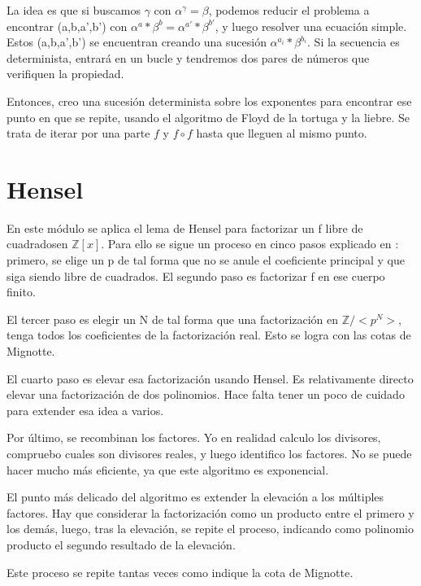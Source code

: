 \documentclass[12pt, a5paper]{article}
\theoremstyle{definition}
\begin{document}
  La idea es que si buscamos $\gamma$ con $\alpha^\gamma=\beta$,
  podemos reducir el problema a encontrar (a,b,a',b') con
  $\alpha^a*\beta^b=\alpha^{a'}*\beta^{b'}$, y luego resolver una
  ecuación simple. Estos (a,b,a',b') se encuentran creando una
  sucesión $\alpha^{a_i}*\beta^{b_i}$. Si la secuencia es
  determinista, entrará en un bucle y tendremos dos pares de números
  que verifiquen la propiedad.

  Entonces, creo una sucesión determinista sobre los exponentes para
  encontrar ese punto en que se repite, usando el algoritmo de Floyd
  de la tortuga y la liebre. Se trata de iterar por una parte $f$ y
  $f\circ f$ hasta que lleguen al mismo punto.
\newpage\newpage
  
\section{Hensel}
  En este módulo se aplica el lema de Hensel para factorizar un f
  libre de cuadradosen
  $\mathbb{Z}[x]$. Para ello se sigue
  un proceso en cinco pasos explicado en \cite{CompAlg}: primero, se
  elige un p de tal forma que no se anule el coeficiente principal y
  que siga siendo libre de cuadrados. El segundo paso es factorizar f
  en ese cuerpo finito.
 
  El tercer paso es elegir un N de tal forma que una
  factorización en $\mathbb{Z}/<p^N>$, tenga todos los coeficientes de
  la factorización real. Esto se logra con las cotas de Mignotte.

  El cuarto paso es elevar esa factorización usando Hensel. Es
  relativamente directo elevar una factorización de dos polinomios.
  Hace falta tener un poco de cuidado para extender esa idea a varios.

  Por último, se recombinan los factores. Yo en realidad calculo los
  divisores, compruebo cuales son divisores reales, y luego identifico
  los factores. No se puede hacer mucho más eficiente, ya que este
  algoritmo es exponencial.

  \newpage\newpage

  El punto más delicado del algoritmo es extender la elevación a los
  múltiples factores. Hay que considerar la factorización como un
  producto entre el primero y los demás, luego, tras la elevación, se
  repite el proceso, indicando como polinomio producto el segundo
  resultado de la elevación.

  Este proceso se repite tantas veces como indique la cota de
  Mignotte.

  \newpage\newpage
\end{document}
